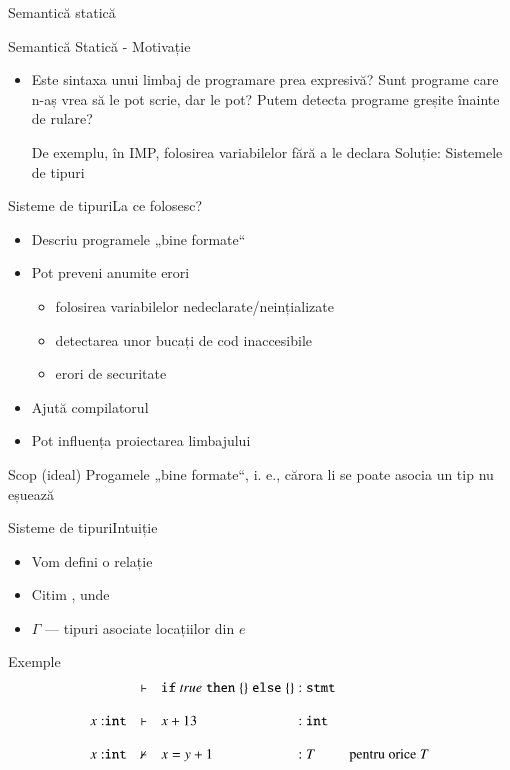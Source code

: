 \documentclass[xcolor=pdftex,romanian,colorlinks]{beamer}
\begin{document}
\begin{section}{Semantică statică}
  \begin{frame}{Semantică Statică - Motivație}
    \begin{itemize}
      \item Este sintaxa unui limbaj de programare prea expresivă?
    \vitem Sunt programe care n-aș vrea să le pot scrie, dar le pot?
    \vitem Putem detecta programe greșite înainte de rulare?

    De exemplu, în IMP, folosirea variabilelor fără a le declara
     Soluție: Sistemele de tipuri
    \end{itemize}
    \end{frame}

    \begin{frame}{Sisteme de tipuri}{La ce folosesc?}

    \begin{itemize}
    \item Descriu programele „bine formate“
    \item Pot preveni anumite erori
    \begin{itemize}
    \item folosirea variabilelor nedeclarate/neințializate
    \item detectarea unor bucați de cod inaccesibile
    \item erori de securitate
    \end{itemize}
    \item Ajută compilatorul
    \item Pot influența proiectarea limbajului
    \end{itemize}
    \vfill
    \begin{block}{Scop (ideal)}
    Progamele „bine formate“, i. e., cărora li se poate asocia un tip nu eșuează
    \end{block}
    \end{frame}
  \begin{frame}{Sisteme de tipuri}{Intuiție}
    \begin{itemize}
    \item Vom defini o relație 
    \item Citim , unde
    \item $\Gamma$ — tipuri asociate locațiilor din $e$
    \end{itemize}

    \begin{block}{Exemple}
    \[\begin{array}{lll@{\;:\;}ll}
    &\vdash& \Sif {\Strue} \Sthen \{\} \Selse \{\} & \terminal{stmt}
    \\\\
    x:\Sint&\vdash& x + 13 & \Sint
    \\\\
    x:\Sint&\not\vdash&x = y +1 &T&\mbox{pentru orice } T
    \end{array}\]
    \end{block}
    \end{frame}


\end{section}
\end{document}
